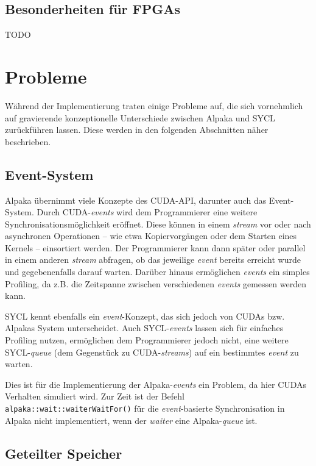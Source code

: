 \subsection{Besonderheiten für FPGAs}

TODO

\section{Probleme}\label{implementierung:probleme}

Während der Implementierung traten einige Probleme auf, die sich vornehmlich
auf gravierende konzeptionelle Unterschiede zwischen Alpaka und SYCL
zurückführen lassen. Diese werden in den folgenden Abschnitten näher
beschrieben.

\subsection{Event-System}\label{implementierung:probleme:events}

Alpaka übernimmt viele Konzepte des CUDA-API, darunter auch das Event-System.
Durch CUDA-\textit{events} wird dem Programmierer eine weitere
Synchronisationsmöglichkeit eröffnet. Diese können in einem \textit{stream} vor
oder nach asynchronen Operationen -- wie etwa Kopiervorgängen oder dem Starten
eines Kernels -- einsortiert werden. Der Programmierer kann dann später oder
parallel in einem anderen \textit{stream} abfragen, ob das jeweilige
\textit{event} bereits erreicht wurde und gegebenenfalls darauf warten. Darüber
hinaus ermöglichen \textit{events} ein simples Profiling, da z.B. die Zeitspanne
zwischen verschiedenen \textit{events} gemessen werden kann.

SYCL kennt ebenfalls ein \textit{event}-Konzept, das sich jedoch von CUDAs bzw.
Alpakas System unterscheidet. Auch SYCL-\textit{events} lassen sich für
einfaches Profiling nutzen, ermöglichen dem Programmierer jedoch nicht, eine
weitere SYCL-\textit{queue} (dem Gegenstück zu CUDA-\textit{streams}) auf ein
bestimmtes \textit{event} zu warten.

Dies ist für die Implementierung der Alpaka-\textit{events} ein Problem, da hier
CUDAs Verhalten simuliert wird. Zur Zeit ist der Befehl
\texttt{alpaka::wait::waiterWaitFor()} für die \textit{event}-basierte
Synchronisation in Alpaka nicht implementiert, wenn der \textit{waiter} eine
Alpaka-\textit{queue} ist.

\subsection{Geteilter Speicher}\label{implementierung:probleme:shared}

